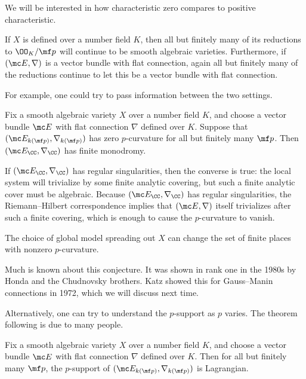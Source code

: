 \documentclass[../notes.tex]{subfiles}
\begin{document}
We will be interested in how characteristic zero compares to positive characteristic.
\begin{remark}
	If $X$ is defined over a number field $K$, then all but finitely many of its reductions to $\OO_K/\mf p$ will continue to be smooth algebraic varieties. Furthermore, if $(\mc E,\nabla)$ is a vector bundle with flat connection, again all but finitely many of the reductions continue to let this be a vector bundle with flat connection.
\end{remark}
For example, one could try to pass information between the two settings.
\begin{conj}[Grothendieck] \label{conj:p-curv}
	Fix a smooth algebraic variety $X$ over a number field $K$, and choose a vector bundle $\mc E$ with flat connection $\nabla$ defined over $K$. Suppose that $(\mc E_{k(\mf p)},\nabla_{k(\mf p)})$ has zero $p$-curvature for all but finitely many $\mf p$. Then $(\mc E_\CC,\nabla_\CC)$ has finite monodromy.
\end{conj}
\begin{remark}
	If $(\mc E_\CC,\nabla_\CC)$ has regular singularities, then the converse is true: the local system will trivialize by some finite analytic covering, but such a finite analytic cover must be algebraic. Because $(\mc E_\CC,\nabla_\CC)$ has regular singularities, the Riemann--Hilbert correspondence implies that $(\mc E,\nabla)$ itself trivializes after such a finite covering, which is enough to cause the $p$-curvature to vanish.
\end{remark}
\begin{remark}
	The choice of global model spreading out $X$ can change the set of finite places with nonzero $p$-curvature.
\end{remark}
\begin{remark}
	Much is known about this conjecture. It was shown in rank one in the 1980s by Honda and the Chudnovsky brothers. Katz showed this for Gauss--Manin connections in 1972, which we will discuss next time.
\end{remark}
Alternatively, one can try to understand the $p$-support as $p$ varies. The theorem following is due to many people.
\begin{theorem}
	Fix a smooth algebraic variety $X$ over a number field $K$, and choose a vector bundle $\mc E$ with flat connection $\nabla$ defined over $K$. Then for all but finitely many $\mf p$, the $p$-support of $(\mc E_{k(\mf p)},\nabla_{k(\mf p)})$ is Lagrangian.
\end{theorem}
\end{document}
